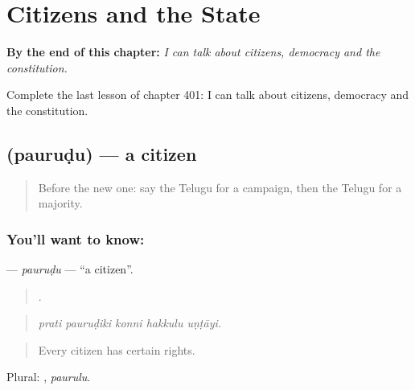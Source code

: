 
\chapter{Citizens and the State}
\label{ch:te-citizens-and-the-state}

\begin{chapteropening}
\textbf{By the end of this chapter:} \emph{I can talk about citizens, democracy and the constitution.}

Complete the last lesson of chapter 401: I can talk about citizens, democracy and the constitution.
\end{chapteropening}

\section[\texorpdfstring{\te{పౌరుడు} (pauruḍu)}{పౌరుడు (pauruḍu)}]{ (pauruḍu) — a citizen}

\label{lesson:TE-C401-paurudu}



\begin{quote}
Before the new one: say the Telugu for a campaign, then the Telugu for a majority.
\end{quote}

\subsection*{You'll want to know: }
\textbf{} — \emph{pauruḍu} — \textquotedblleft{}a citizen\textquotedblright{}.

\begin{quote}
    .
\end{quote}

\begin{quote}
\emph{prati pauruḍiki konni hakkulu uṇṭāyi.}
\end{quote}

\begin{quote}
Every citizen has certain rights.
\end{quote}

Plural: , \emph{paurulu}.

